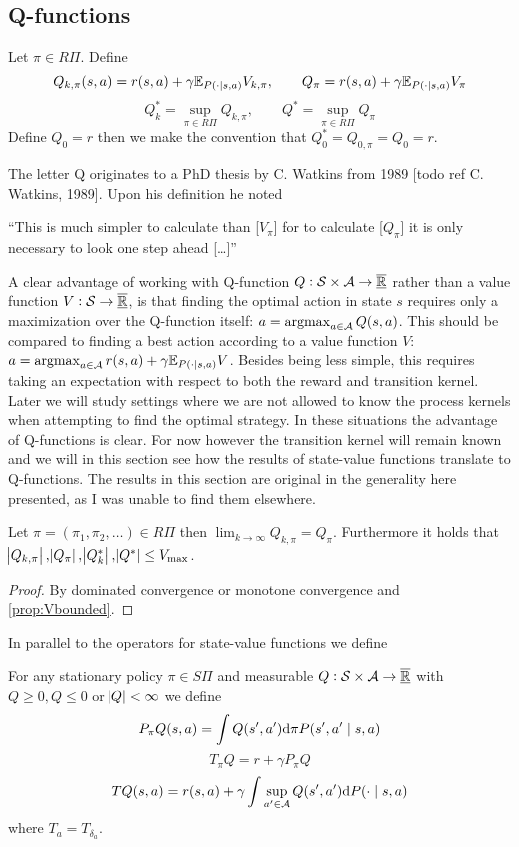 \subsection{Q-functions}
\begin{defn}
  Let $\pi \in R\Pi$.
  Define
  \[ Q_{k, \pi}(s, a) = r(s, a) + \gamma \mathbb{E}_{P(\cdot \mid s, a)} V_{k, \pi}
  ,\qquad Q_\pi = r(s, a) + \gamma \mathbb{E}_{P(\cdot \mid s, a)} V_\pi \]
  \[ Q^*_k = \sup_{\pi \in R\Pi} Q_{k, \pi}
  , \qquad Q^* = \sup_{\pi \in R\Pi} Q_\pi \]
  Define $Q_0 = r$ then we make the convention that
  $Q^*_0 = Q_{0,\pi} = Q_0 = r$.
\end{defn}
The letter Q originates to a PhD thesis by C. Watkins from 1989
[todo ref C. Watkins, 1989]. Upon his definition he noted
\begin{displayquote}
  ``This is much simpler to calculate than [$V_\pi$]
  for to calculate [$Q_\pi$] it is only necessary to look one
  step ahead [\ldots]''
\end{displayquote}
A clear advantage of working with Q-function
$Q:\mathcal{S}\times\mathcal{A} \to \overline{\underline{\mathbb{R}}}$ rather than a value function
$V:\mathcal{S}\to \overline{\underline{\mathbb{R}}}$,
is that finding the optimal action in state $s$
requires only a maximization over the Q-function itself:
$a = \operatorname*{argmax}_{a \in \mathcal{A}} Q(s,a)$.
This should be compared to finding a best action according to a value
function $V$:
$a = \operatorname*{argmax}_{a \in \mathcal{A}} r(s,a) + \gamma \mathbb{E}_{P(\cdot \mid s,a)} V$.
Besides being less simple,
this requires taking an expectation with respect to 
both the reward and transition kernel.
Later we will study settings where we are not allowed to know
the process kernels when attempting to find the optimal strategy.
In these situations the advantage of Q-functions is clear.
For now however the transition kernel will remain known and we
will in this section see how the results of state-value functions
translate to Q-functions.
The results in this section are original in the generality here presented,
as I was unable to find them elsewhere.

\begin{prop}
  Let $\pi = (\pi_1, \pi_2, \dots) \in R\Pi$ then
  $\lim_{k \to \infty} Q_{k, \pi} = Q_\pi$. Furthermore it holds that
  $\abs{Q_{k, \pi}}, \abs{Q_\pi}, \abs{Q^*_k}, \abs{Q^*} \leq V_{\max}$.
\end{prop}
\begin{proof}
  By dominated convergence or monotone convergence and \cref{prop:Vbounded}.
\end{proof}

In parallel to the operators for state-value functions we define
\begin{defn}
  For any stationary policy $\pi \in S\Pi$
  and measurable $Q:\mathcal{S} \times \mathcal{A} \to \overline{\underline{\mathbb{R}}}$ with
  $Q \geq 0, Q \leq 0$ or $\abs{Q} < \infty$ we define
  \[ P_\pi Q(s, a) = \int Q(s', a') \mathrm{d} \pi P(s', a' \mid s, a) \]
  \[ T_\pi Q = r + \gamma P_\pi Q \]
  \[ T Q(s, a) = r(s, a) + \gamma
  \int \sup_{a' \in \mathcal{A}} Q(s', a') \mathrm{d} P(\cdot \mid s, a) \]
  where $T_a = T_{\delta_a}$.
\end{defn}
 
